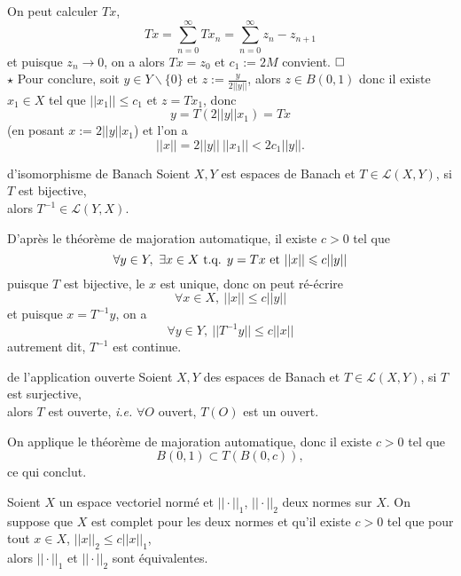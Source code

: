 \documentclass[a4paper,11pt, twoside]{article}
\begin{document}
\begin{Proof}
  On peut calculer $Tx$,
  $$Tx=\sum_{n=0}^\infty Tx_n=\sum_{n=0}^\infty z_n-z_{n+1}$$
  et puisque $z_n\longrightarrow 0$, on a alors $Tx=z_0$ et $c_1:=2M$ convient.
  $\hfill\square$\\

  $\star$ Pour conclure, soit $y\in Y\backslash \{0\}$ et $z:=\frac{y}{2||y||}$, alors $z\in B(0,1)$ donc il existe $x_1\in X$ tel que $||x_1||\leqslant c_1$ et $z=Tx_1$, donc
  $$y=T(2||y||x_1)=Tx$$
  (en posant $x:=2||y||x_1$) et l'on a 
  $$||x||=2||y||\ ||x_1||<2c_1||y||.$$
\end{Proof}


\begin{thC}{d'isomorphisme de Banach}
  Soient $X,Y$ est espaces de Banach et $T\in \mathcal L(X,Y)$, si $T$ est bijective,\\

  alors $T^{-1}\in \mathcal L(Y,X)$.
\end{thC}

\begin{Proof}
  D'après le théorème de majoration automatique, il existe $c>0$ tel que
  $$\forall y\in Y,\ \exists x\in X\text{ t.q. } y=Tx\text{ et }||x||\leqslant c||y||$$
  puisque $T$ est bijective, le $x$ est unique, donc on peut ré-écrire 
  $$\forall x\in X,\ ||x||\leqslant c||y||$$
  et puisque $x=T^{-1}y$, on a 
  $$\forall y\in Y,\ ||T^{-1}y||\leqslant c||x||$$
  autrement dit, $T^{-1}$ est continue. 
\end{Proof}


\begin{thC}{de l'application ouverte}
  Soient $X,Y$ des espaces de Banach et $T\in\mathcal L(X,Y)$, si $T$ est surjective,\\

  alors $T$ est ouverte, \emph{i.e.} $\forall O$ ouvert, $T(O)$ est un ouvert.
\end{thC}


\begin{Proof}
  On applique le théorème de majoration automatique, donc il existe $c>0$ tel que 
  $$B(0,1)\subset T\left(B(0,c)\right),$$
  ce qui conclut.
\end{Proof}


\begin{prop}
  Soient $X$ un espace vectoriel normé et $||\cdot||_1$, $||\cdot||_2$ deux normes sur $X$. On suppose que $X$ est complet pour les deux normes et qu'il existe $c>0$ tel que pour tout $x\in X$, $||x||_2\leqslant c||x||_1$,\\ 

  alors $||\cdot||_1$ et $||\cdot||_2$ sont équivalentes.
\end{prop}
\end{document}
